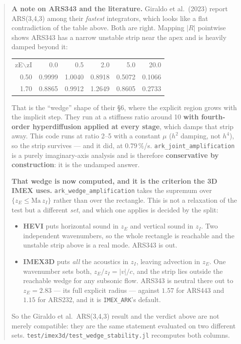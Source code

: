 \documentclass[11pt,a4paper]{article}
\begin{document}
\begin{quote}
\textbf{A note on ARS343 and the literature.} Giraldo et al.\ (2023) report
ARS(3,4,3) among their \emph{fastest} integrators, which looks like a flat
contradiction of the table above. Both are right. Mapping $|R|$ pointwise shows
ARS343 has a narrow unstable strip near the apex and is heavily damped beyond
it:
\begin{center}\ttfamily\small
\begin{tabular}{rrrrrr}
zE$\backslash$zI & 0.0 & 0.5 & 2.0 & 5.0 & 20.0\\
0.50 & 0.9999 & 1.0040 & 0.8918 & 0.5072 & 0.1066\\
1.70 & 0.8865 & 0.9912 & 1.2649 & 0.8605 & 0.2733\\
\end{tabular}
\end{center}
That is the ``wedge'' shape of their \S6, where the explicit region grows with
the implicit step. They run at a stiffness ratio around 10 \textbf{with
fourth-order hyperdiffusion applied at every stage}, which damps that strip
away. This code runs at ratio 2--5 with a constant $\mu$ ($h^2$ damping, not
$h^4$), so the strip survives --- and it did, at $0.79\,\%$/s.
\texttt{ark\_joint\_amplification} is a purely imaginary-axis analysis and is
therefore \textbf{conservative by construction}: it is the undamped answer.

\medskip
\textbf{That wedge is now computed, and it is the criterion the 3D IMEX uses.}
\texttt{ark\_wedge\_amplification} takes the supremum over
$\{z_E \le \mathrm{Ma}\,z_I\}$ rather than over the rectangle. This is not a
relaxation of the test but a different \emph{set}, and which one applies is
decided by the split:
\begin{itemize}
\item \textbf{HEVI} puts horizontal sound in $z_E$ and vertical sound in
      $z_I$. Two independent wavenumbers, so the whole rectangle is reachable
      and the unstable strip above is a real mode. ARS343 is out.
\item \textbf{IMEX3D} puts \emph{all} the acoustics in $z_I$, leaving
      advection in $z_E$. One wavenumber sets both, $z_E/z_I=|v|/c$, and the
      strip lies outside the reachable wedge for any subsonic flow. ARS343 is
      neutral there out to $z_E=2.83$ --- its full explicit radius --- against
      $1.57$ for ARS443 and $1.15$ for ARS232, and it is \texttt{IMEX\_ARK}'s
      default.
\end{itemize}
So the Giraldo et al.\ ARS(3,4,3) result and the verdict above are not merely
compatible: they are the same statement evaluated on two different sets.
\texttt{test/imex3d/test\_wedge\_stability.jl} recomputes both columns.
\end{quote}
\end{document}

